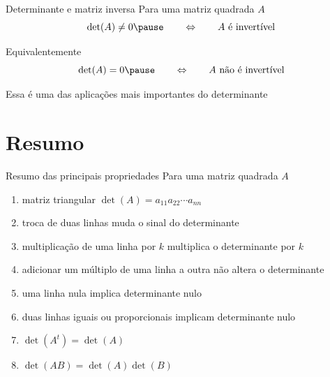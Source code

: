 \documentclass[fleqn,aspectratio=169,12pt]{beamer}
\begin{document}
\begin{frame}{Determinante e matriz inversa}
  Para uma matriz quadrada $A$
  \pause
  \[
    \det(A) \neq 0
    \pause
    \qquad\Leftrightarrow\qquad
    A \text{ é invertível}
  \]

  \pause
  Equivalentemente
  \[
    \det(A) = 0
    \pause
    \qquad\Leftrightarrow\qquad
    A \text{ não é invertível}
  \]

  \pause
  Essa é uma das aplicações mais importantes do determinante
\end{frame}







\section{Resumo}

\begin{frame}{Resumo das principais propriedades}
  Para uma matriz quadrada $A$
  \begin{enumerate}
    \item matriz triangular
    \(
      \det(A) = a_{11} a_{22} \cdots a_{nn}
    \)
    \item troca de duas linhas muda o sinal do determinante
    \item multiplicação de uma linha por $k$ multiplica o determinante por $k$
    \item adicionar um múltiplo de uma linha a outra não altera o determinante
    \item uma linha nula implica determinante nulo
    \item duas linhas iguais ou proporcionais implicam determinante nulo
    \item \(\det(A^t) = \det(A)\)
    \item \(\det(AB) = \det(A)\det(B)\)
  \end{enumerate}
\end{frame}

\end{document}
